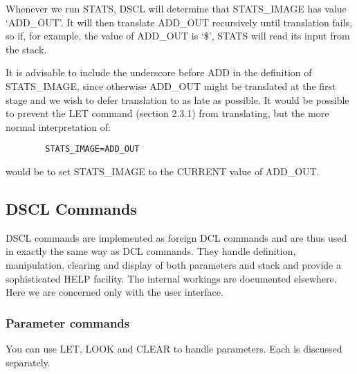 Whenever we run STATS, DSCL will determine that STATS\_IMAGE has value
`ADD\_OUT'.
It will then translate ADD\_OUT recursively until translation fails, so if, for
example, the value of ADD\_OUT is `\$', STATS will read its input from the
stack.

It is advisable to include the underscore before ADD in the definition of
STATS\_IMAGE, since otherwise ADD\_OUT might be translated at the first stage
and we wish to defer translation to as late as possible.
It would be possible to prevent the LET command (section 2.3.1) from
translating, but the more normal interpretation of:
\begin{verbatim}
        STATS_IMAGE=ADD_OUT
\end{verbatim}
would be to set STATS\_IMAGE to the CURRENT value of ADD\_OUT.
\subsection {DSCL Commands}
DSCL commands are implemented as foreign DCL commands and are thus used in
exactly the same way as DCL commands.
They handle definition, manipulation, clearing and display of both parameters
and stack and provide a sophisticated HELP facility.
The internal workings are documented elsewhere.
Here we are concerned only with the user interface.
\subsubsection {Parameter commands}
You can use LET, LOOK and CLEAR to handle parameters.
Each is discussed separately.
